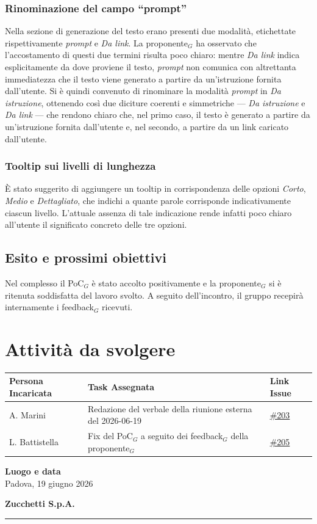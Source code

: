 \documentclass[a4paper, 10pt, colorlinks=true, linkcolor=black, urlcolor=blue, citecolor=blue, hidelinks]{article}
\newcommand{\dataverbale}{2026-06-19}
\newcommand{\issue}[1]{\href{https://github.com/thebitless-group-swe/thebitless.github.io/issues/#1}{\##1}}
\begin{document}
\subsubsection{Rinominazione del campo ``prompt''}
Nella sezione di generazione del testo erano presenti due modalità, etichettate rispettivamente \textit{prompt} e \textit{Da link}. La proponente$_G$ ha osservato che l'accostamento di questi due termini risulta poco chiaro: mentre \textit{Da link} indica esplicitamente da dove proviene il testo, \textit{prompt} non comunica con altrettanta immediatezza che il testo viene generato a partire da un'istruzione fornita dall'utente. Si è quindi convenuto di rinominare la modalità \textit{prompt} in \textit{Da istruzione}, ottenendo così due diciture coerenti e simmetriche — \textit{Da istruzione} e \textit{Da link} — che rendono chiaro che, nel primo caso, il testo è generato a partire da un'istruzione fornita dall'utente e, nel secondo, a partire da un link caricato dall'utente.

\subsubsection{Tooltip sui livelli di lunghezza}
È stato suggerito di aggiungere un tooltip in corrispondenza delle opzioni \textit{Corto}, \textit{Medio} e \textit{Dettagliato}, che indichi a quante parole corrisponde indicativamente ciascun livello. L'attuale assenza di tale indicazione rende infatti poco chiaro all'utente il significato concreto delle tre opzioni.

\subsection{Esito e prossimi obiettivi}
Nel complesso il PoC$_G$ è stato accolto positivamente e la proponente$_G$ si è ritenuta soddisfatta del lavoro svolto. A seguito dell'incontro, il gruppo recepirà internamente i feedback$_G$ ricevuti.
\section{Attività da svolgere}

\begin{center}
\renewcommand{\arraystretch}{1.4}
\begin{tabular}{|p{4.2cm}|p{6.2cm}|p{2.2cm}|}
\hline
\textbf{Persona Incaricata} & \textbf{Task Assegnata} & \centering\textbf{Link Issue} \tabularnewline
\hline
A. Marini & Redazione del verbale della riunione esterna del \dataverbale & \centering \issue{203} \tabularnewline
\hline
L. Battistella & Fix del PoC$_G$ a seguito dei feedback$_G$ della proponente$_G$ & \centering \issue{205} \tabularnewline
\hline
\end{tabular}
\end{center}

\vfill

\noindent
\begin{minipage}[t]{0.45\textwidth}
  \textbf{Luogo e data} \\
  \vspace{0.5cm}
  Padova, 19 giugno 2026
\end{minipage}
\hfill
\begin{minipage}[t]{0.45\textwidth}
  \raggedleft
  \textbf{Zucchetti S.p.A.} \\
  \vspace{1.8cm}
  \rule{6cm}{0.4pt}
\end{minipage}
\end{document}

